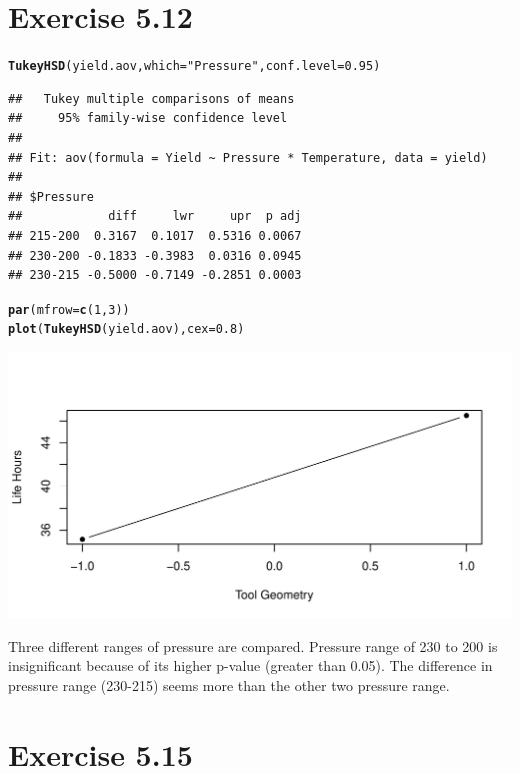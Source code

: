 \documentclass[a4paper]{article}\usepackage{graphicx, color}
\makeatletter
\def\maxwidth{ %
  \ifdim\Gin@nat@width>\linewidth
    \linewidth
  \else
    \Gin@nat@width
  \fi
}
\newcommand{\hlfunctioncall}[1]{\textcolor[rgb]{0.501960784313725,0,0.329411764705882}{\textbf{#1}}}%
\newcommand{\hlstring}[1]{\textcolor[rgb]{0.6,0.6,1}{#1}}%
\newenvironment{kframe}{%
 \def\at@end@of@kframe{}%
 \ifinner\ifhmode%
  \def\at@end@of@kframe{\end{minipage}}%
  \begin{minipage}{\columnwidth}%
 \fi\fi%
 \def\FrameCommand##1{\hskip\@totalleftmargin \hskip-\fboxsep
 \colorbox{shadecolor}{##1}\hskip-\fboxsep
     \hskip-\linewidth \hskip-\@totalleftmargin \hskip\columnwidth}%
 \MakeFramed {\advance\hsize-\width
   \@totalleftmargin\z@ \linewidth\hsize
   \@setminipage}}%
 {\par\unskip\endMakeFramed%
 \at@end@of@kframe}
\newenvironment{knitrout}{}{} %
\makeatother
\begin{document}
\section{ Exercise 5.12}
\begin{knitrout}
\color{fgcolor}\begin{kframe}
\begin{alltt}
\hlfunctioncall{TukeyHSD}(yield.aov, which = \hlstring{"Pressure"}, conf.level = 0.95)
\end{alltt}
\begin{verbatim}
##   Tukey multiple comparisons of means
##     95% family-wise confidence level
## 
## Fit: aov(formula = Yield ~ Pressure * Temperature, data = yield)
## 
## $Pressure
##            diff     lwr     upr  p adj
## 215-200  0.3167  0.1017  0.5316 0.0067
## 230-200 -0.1833 -0.3983  0.0316 0.0945
## 230-215 -0.5000 -0.7149 -0.2851 0.0003
\end{verbatim}
\begin{alltt}
\hlfunctioncall{par}(mfrow = \hlfunctioncall{c}(1, 3))
\hlfunctioncall{plot}(\hlfunctioncall{TukeyHSD}(yield.aov), cex = 0.8)
\end{alltt}
\end{kframe}
\includegraphics[width=\maxwidth]{figure/unnamed-chunk-6} 

\end{knitrout}


Three different ranges of pressure are compared. Pressure range of 230 to 200 is insignificant because of its higher p-value (greater than 0.05). The difference in pressure range (230-215) seems more than the other two pressure range. \\

\vspace{2 mm}

\section{ Exercise 5.15}
\end{document}
